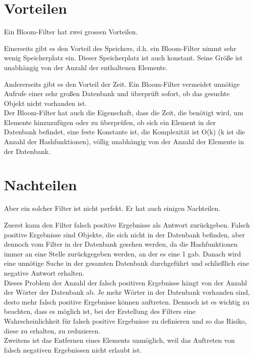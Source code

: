 \documentclass[12pt, letterpaper]{article}
\begin{document}
\section{Vorteilen}

Ein Bloom-Filter hat zwei grossen Vorteilen.

Einerseits gibt es den Vorteil des Speichers, d.h. ein Bloom-Filter nimmt sehr wenig Speicherplatz ein. Dieser Speicherplatz ist auch konstant. Seine Größe ist unabhängig von der Anzahl der enthaltenen Elemente.

Andererseits gibt es den Vorteil der Zeit. Ein Bloom-Filter vermeidet unnötige Aufrufe einer sehr großen Datenbank und überprüft sofort, ob das gesuchte Objekt nicht vorhanden ist.\\

Der Bloom-Filter hat auch die Eigenschaft, dass die Zeit, die benötigt wird, um Elemente hinzuzufügen oder zu überprüfen, ob sich ein Element in der Datenbank befindet, eine feste Konstante ist, die Komplexität ist O(k) (k ist die Anzahl der Hashfunktionen), völlig unabhängig von der Anzahl der Elemente in der Datenbank.

\section{Nachteilen}

Aber ein solcher Filter ist nicht perfekt. Er hat auch einigen Nachteilen.

Zuerst kann den Filter falsch positive Ergebnisse als Antwort zurückgeben. Falsch positive Ergebnisse sind Objekte, die sich nicht in der Datenbank befinden, aber dennoch vom Filter in der Datenbank gesehen werden, da die Hashfunktionen immer an eine Stelle zurückgegeben werden, an der es eine 1 gab. Danach wird eine unnötige Suche in der gesamten Datenbank durchgeführt und schließlich eine negative Antwort erhalten.\\
Dieses Problem der Anzahl der falsch positiven Ergebnisse hängt von der Anzahl der Wörter der Datenbank ab. Je mehr Wörter in der Datenbank vorhanden sind, desto mehr falsch positive Ergebnisse können auftreten. Dennoch ist es wichtig zu beachten, dass es möglich ist, bei der Erstellung des Filters eine Wahrscheinlichkeit für falsch positive Ergebnisse zu definieren und so das Risiko, diese zu erhalten, zu reduzieren.\\

Zweitens ist das Entfernen eines Elements unmöglich, weil das Auftreten von falsch negativen Ergebnissen nicht erlaubt ist.
\end{document}
